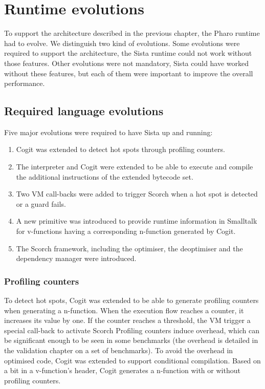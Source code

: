 \documentclass[a4paper,12pt,twoside]{../includes/ThesisStyle}
\begin{document}
\fi

\chapter{Runtime evolutions}
\label{chap:runtimeEvolution}
\minitoc

To support the architecture described in the previous chapter, the Pharo runtime had to evolve. We distinguish two kind of evolutions. Some evolutions were required to support the architecture, the Sista runtime could not work without those features. Other evolutions were not mandatory, Sista could have worked without these features, but each of them were important to improve the overall performance.


\section{Required language evolutions}

Five major evolutions were required to have Sista up and running:
\begin{enumerate}
	\item Cogit was extended to detect hot spots through profiling counters.
	\item The interpreter and Cogit were extended to be able to execute and compile the additional instructions of the extended bytecode set.
	\item Two VM call-backs were added to trigger Scorch when a hot spot is detected or a guard fails.
	\item A new primitive was introduced to provide runtime information in Smalltalk for v-functions having a corresponding n-function generated by Cogit.
	\item The Scorch framework, including the optimiser, the deoptimiser and the dependency manager were introduced.
\end{enumerate}

\subsection{Profiling counters}

To detect hot spots, Cogit was extended to be able to generate profiling counters when generating a n-function. When the execution flow reaches a counter, it increases its value by one. If the counter reaches a threshold, the VM trigger a special call-back to activate Scorch Profiling counters induce overhead, which can be significant enough to be seen in some benchmarks (the overhead is detailed in the validation chapter on a set of benchmarks). To avoid the overhead in optimised code, Cogit was extended to support conditional compilation. Based on a bit in a v-function's header, Cogit generates a n-function with or without profiling counters. 
\end{document}
